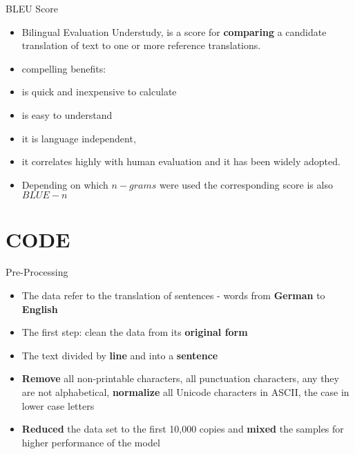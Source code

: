 \documentclass{beamer}
\begin{document}
\begin{frame}{BLEU Score}
	\begin{itemize}
		\item Bilingual Evaluation Understudy, is a score for \textbf{comparing} a candidate translation of text to one or more reference translations.
		
		\item compelling benefits: \\
		\item is quick and inexpensive to calculate\\
		\item is easy to understand\\
	\item	it is language independent, \\
	\item	it correlates highly with human evaluation and it has been widely adopted.
	\item Depending on which \textbf{$n-grams$} were used the corresponding score is also \textbf{$BLUE-n$}
		
	\end{itemize}\end{frame}






\section{CODE}

\begin{frame}{Pre-Processing}
	\begin{itemize}
		\item The data refer to the translation of sentences - words from \textbf{German} to \textbf{English}
		\item The first step: clean the data from its \textbf{original form}
		\item The text divided by \textbf{line} and into a \textbf{sentence}
		\item  \textbf{Remove} all non-printable characters, all
		punctuation characters,  any they are not alphabetical, \textbf{normalize} all Unicode characters in ASCII, the case in lower case letters
		\item  \textbf{Reduced} the data set to the first 10,000 copies and \textbf{mixed} the samples for higher performance of the model
		
		
	\end{itemize}
\end{frame}
\end{document}
